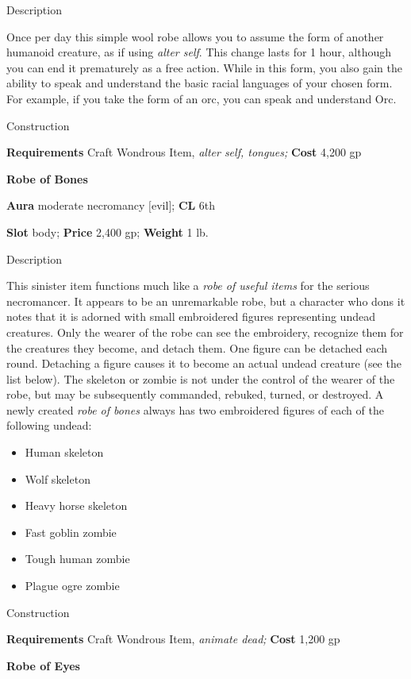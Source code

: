 Description
				
Once per day this simple wool robe allows you to assume the form of another humanoid creature, as if using \textit{alter self}. This change lasts for 1 hour, although you can end it prematurely as a free action. While in this form, you also gain the ability to speak and understand the basic racial languages of your chosen form. For example, if you take the form of an orc, you can speak and understand Orc. 
				
Construction
				
\textbf{Requirements} Craft Wondrous Item,\textit{ alter self, tongues;}\textbf{ Cost }4,200 gp
				
\textbf{Robe of Bones}
				
\textbf{Aura} moderate necromancy \mbox{$[$}evil\mbox{$]$};\textbf{ CL }6th
				
\textbf{Slot} body; \textbf{Price} 2,400 gp; \textbf{Weight} 1 lb.
				
Description
				
This sinister item functions much like a \textit{robe of useful items} for the serious necromancer. It appears to be an unremarkable robe, but a character who dons it notes that it is adorned with small embroidered figures representing undead creatures. Only the wearer of the robe can see the embroidery, recognize them for the creatures they become, and detach them. One figure can be detached each round. Detaching a figure causes it to become an actual undead creature (see the list below). The skeleton or zombie is not under the control of the wearer of the robe, but may be subsequently commanded, rebuked, turned, or destroyed. A newly created \textit{robe of bones }always has two embroidered figures of each of the following undead:
				\begin{itemize}\item  Human skeleton
				\item  Wolf skeleton
				\item  Heavy horse skeleton
				\item  Fast goblin zombie
				\item  Tough human zombie
				\item  Plague ogre zombie 
\end{itemize}
				
Construction
				
\textbf{Requirements} Craft Wondrous Item, \textit{animate dead;}\textbf{ Cost }1,200 gp
				
\textbf{Robe of Eyes}
				
